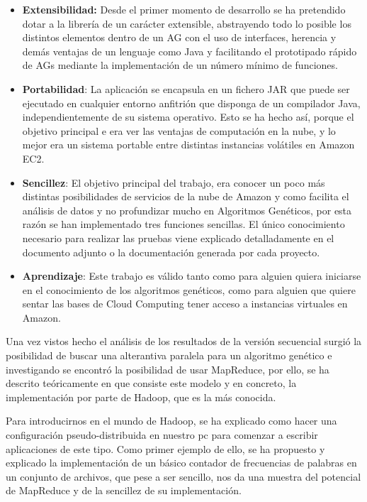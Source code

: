 \documentclass[runningheads]{llncs}
\begin{document}
\begin{itemize}
 \item \textbf{Extensibilidad:} Desde el primer momento de desarrollo se ha pretendido dotar a la librería de un carácter extensible, 
 abstrayendo todo lo posible los distintos elementos dentro de un AG con el uso de interfaces, herencia y demás 
 ventajas de un lenguaje como Java y facilitando el prototipado rápido de AGs  mediante la implementación de un número mínimo de 
 funciones.

 \item \textbf{Portabilidad}: La aplicación se encapsula en un fichero JAR que puede ser ejecutado en cualquier entorno anfitrión que 
 disponga de un compilador Java, independientemente de su sistema operativo. Esto se ha hecho así, porque el objetivo principal e
 era ver las ventajas de computación en la nube, y lo mejor era un sistema portable entre distintas instancias volátiles en 
 Amazon EC2.

 \item \textbf{Sencillez}: El objetivo principal del trabajo, era conocer un poco más distintas posibilidades de servicios de la 
 nube de Amazon y como facilita el análisis de datos  y no profundizar mucho en Algoritmos Genéticos, por esta razón se han 
 implementado tres funciones sencillas. El único conocimiento necesario para realizar las pruebas viene explicado detalladamente 
 en el documento adjunto o la documentación generada por cada proyecto.
 
 \item \textbf{Aprendizaje}: Este trabajo es válido tanto como para alguien quiera iniciarse en el conocimiento de los algoritmos 
 genéticos, como para alguien que quiere sentar las bases de Cloud Computing tener acceso a instancias virtuales en Amazon.
 
\end{itemize}


Una vez vistos hecho el análisis de los resultados de la versión secuencial surgió la posibilidad de buscar una alterantiva  
paralela para un algoritmo genético  e investigando se encontró la posibilidad de  usar MapReduce, por ello, se ha descrito 
teóricamente en que consiste este modelo y en concreto, la implementación por parte de  Hadoop, que es la 
más conocida. 


Para introducirnos en el mundo de Hadoop, se ha explicado como hacer una configuración pseudo-distribuida en nuestro pc para 
comenzar a escribir aplicaciones de este tipo. Como primer ejemplo de ello, se ha propuesto y explicado la 
implementación de un básico contador de frecuencias de palabras en un conjunto de archivos, 
que pese a ser sencillo, nos da una muestra del potencial de MapReduce y de la sencillez de su implementación.  
\end{document}
